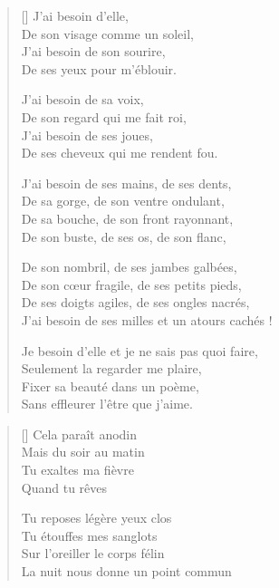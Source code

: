 \newpage

\settowidth{\versewidth}{J'ai besoin de ses milles et un atours cachés !}
\begin{verse}[\versewidth]
J'ai besoin d'elle, \\
De son visage comme un soleil, \\
J'ai besoin de son sourire, \\
De ses yeux pour m'éblouir.

J'ai besoin de sa voix, \\
De son regard qui me fait roi, \\
J'ai besoin de ses joues, \\
De ses cheveux qui me rendent fou.

J'ai besoin de ses mains, de ses dents, \\
De sa gorge, de son ventre ondulant, \\
De sa bouche, de son front rayonnant, \\
De son buste, de ses os, de son flanc,

De son nombril, de ses jambes galbées, \\
De son cœur fragile, de ses petits pieds, \\
De ses doigts agiles, de ses ongles nacrés, \\
J'ai besoin de ses milles et un atours cachés !

Je besoin d'elle et je ne sais pas quoi faire, \\
Seulement la regarder me plaire, \\
Fixer sa beauté dans un poème, \\
Sans effleurer l'être que j'aime.
\end{verse}

\newpage

\settowidth{\versewidth}{La nuit nous donne un point commun}
\begin{verse}[\versewidth]
Cela paraît anodin \\
Mais du soir au matin \\
Tu exaltes ma fièvre \\
Quand tu rêves

Tu reposes légère yeux clos \\
Tu étouffes mes sanglots \\
Sur l'oreiller le corps félin \\
La nuit nous donne un point commun
\end{verse}

